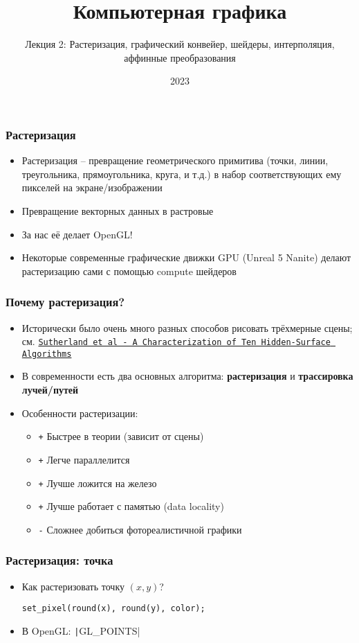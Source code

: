 \documentclass[10pt]{beamer}
\title{Компьютерная графика}
\subtitle{Лекция 2: Растеризация, графический конвейер, шейдеры, интерполяция, аффинные преобразования}
\date{2023}
\begin{document}
\frame{\titlepage}

\begin{frame}
\frametitle{Растеризация}
\begin{itemize}
\item Растеризация -- превращение геометрического примитива (точки, линии, треугольника, прямоугольника, круга, и т.д.) в набор соответствующих ему пикселей на экране/изображении
\pause
\item Превращение векторных данных в растровые
\pause
\item За нас её делает OpenGL!
\pause
\item Некоторые современные графические движки GPU (Unreal 5 Nanite) делают растеризацию сами с помощью compute шейдеров
\end{itemize}
\end{frame}

\begin{frame}
\frametitle{Почему растеризация?}
\begin{itemize}
\item Исторически было очень много разных способов рисовать трёхмерные сцены; см. \href{https://dl.acm.org/doi/pdf/10.1145/356625.356626}{\texttt{Sutherland et al - A Characterization of Ten Hidden-Surface Algorithms}}
\pause
\item В современности есть два основных алгоритма: \textbf{растеризация} и \textbf{трассировка лучей/путей}
\pause
\item Особенности растеризации:
\begin{itemize}
\item {\color{green}\texttt{+}} Быстрее в теории (зависит от сцены)
\pause
\item {\color{green}\texttt{+}} Легче параллелится
\pause
\item {\color{green}\texttt{+}} Лучше ложится на железо
\pause
\item {\color{green}\texttt{+}} Лучше работает с памятью (data locality)
\pause
\item {\color{red}\texttt{-}} Сложнее добиться фотореалистичной графики
\end{itemize}
\end{itemize}
\end{frame}

\begin{frame}[fragile]
\frametitle{Растеризация: точка}
\begin{itemize}
\item Как растеризовать точку \begin{math}(x, y)\end{math}?
\pause
{}
\begin{verbatim}
set_pixel(round(x), round(y), color);
\end{verbatim}
\pause
{}
\item В OpenGL: \texttt|GL_POINTS|
\end{itemize}
\end{frame}
\end{document}
